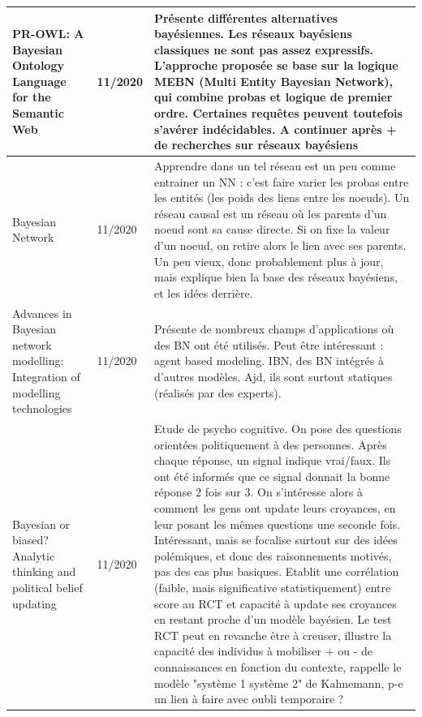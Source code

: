 \documentclass[french]{article}
\begin{document}
    \newpage
    \begin{table}[ht!]
        \begin{center}
        \begin{tabular}{|p{}|p{}|p{}|}

            \hline
            PR-OWL: A Bayesian Ontology Language for the Semantic Web \cite{da_costa_pr-owl_2008}
            & 11/2020
            & Présente différentes alternatives bayésiennes. Les réseaux bayésiens classiques ne sont pas assez expressifs. L'approche proposée se base sur la logique MEBN (Multi Entity Bayesian Network), qui combine probas et logique de premier ordre. Certaines requêtes peuvent toutefois s'avérer indécidables. A continuer après + de recherches sur réseaux bayésiens\\
            \hline
            Bayesian Network \cite{pearl_bayesian_2011}
            & 11/2020
            & Apprendre dans un tel réseau est un peu comme entrainer un NN : c'est faire varier les probas entre les entités (les poids des liens entre les noeuds). Un réseau causal est un réseau où les parents d'un noeud sont sa cause directe. Si on fixe la valeur d'un noeud, on retire alors le lien avec ses parents. Un peu vieux, donc probablement plus à jour, mais explique bien la base des réseaux bayésiens, et les idées derrière.
            \\
            \hline
            Advances in Bayesian network modelling: Integration of modelling technologies \cite{marcot_advances_2019}
            & 11/2020
            & Présente de nombreux champs d'applications où des BN ont été utilisés. Peut être intéressant : agent based modeling. IBN, des BN intégrés à d'autres modèles. Ajd, ils sont surtout statiques (réalisés par des experts).
            \\
            \hline
            Bayesian or biased? Analytic thinking and political belief updating  \cite{tappin_bayesian_2020}
            & 11/2020
            & Etude de psycho cognitive. On pose des questions orientées politiquement à des personnes. Après chaque réponse, un signal indique vrai/faux. Ils ont été informés que ce signal donnait la bonne réponse 2 fois sur 3. On s'intéresse alors à comment les gens ont update leurs croyances, en leur posant les mêmes questions une seconde fois. Intéressant, mais se focalise surtout sur des idées polémiques, et donc des raisonnements motivés, pas des cas plus basiques. Etablit une corrélation (faible, mais significative statistiquement) entre score au RCT et capacité à update ses croyances en restant proche d'un modèle bayésien. Le test RCT peut en revanche être à creuser, illustre la capacité des individus à mobiliser + ou - de connaissances en fonction du contexte, rappelle le modèle "système 1 système 2" de Kahnemann, p-e un lien à faire avec oubli temporaire ?

\end{tabular}
\end{center}
\end{table}
\end{document}
